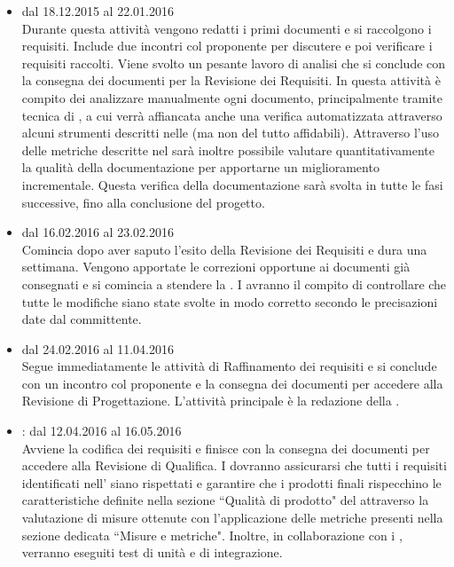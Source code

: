 \documentclass[a4paper, titlepage]{article}
\begin{document}
	\begin{itemize}
		\item {} dal 18.12.2015 al 22.01.2016\\
		Durante questa attività vengono redatti i primi documenti e  si raccolgono i requisiti. Include due incontri col proponente per discutere e poi verificare i requisiti raccolti. Viene svolto un pesante lavoro di analisi che si conclude con la consegna dei documenti per la Revisione dei Requisiti. In questa attività è compito dei  analizzare manualmente ogni documento, principalmente tramite tecnica di , a cui verrà affiancata anche una verifica automatizzata attraverso alcuni strumenti descritti nelle  (ma non del tutto affidabili).
		Attraverso l'uso delle metriche descritte nel  sarà inoltre possibile valutare quantitativamente la qualità della documentazione per apportarne un miglioramento incrementale. Questa verifica della documentazione sarà svolta in tutte le fasi successive, fino alla conclusione del progetto.
		
		\item {} dal 16.02.2016 al 23.02.2016\\
		Comincia dopo aver saputo l'esito della Revisione dei Requisiti e dura  una settimana. Vengono apportate le correzioni opportune ai documenti già consegnati e si comincia a stendere la . I  avranno il compito di controllare che tutte le modifiche siano state svolte in modo corretto secondo le precisazioni date dal committente.
		
		\item {} dal 24.02.2016 al 11.04.2016\\
		Segue immediatamente le attività di Raffinamento dei requisiti e si conclude con un incontro col proponente e la consegna dei documenti per accedere alla Revisione di Progettazione. L'attività principale è la redazione della .
		
		\item {}: dal 12.04.2016 al 16.05.2016\\
		Avviene la codifica dei requisiti e finisce con la consegna dei documenti per accedere alla Revisione di Qualifica. I  dovranno assicurarsi che tutti i requisiti identificati nell' siano rispettati e garantire che i prodotti finali rispecchino le caratteristiche definite nella sezione ``Qualità di prodotto" del  attraverso la valutazione di misure ottenute con l'applicazione delle metriche presenti nella sezione dedicata ``Misure e metriche". Inoltre, in collaborazione con i , verranno eseguiti test di unità e di integrazione.
		

\end{itemize}
\end{document}
